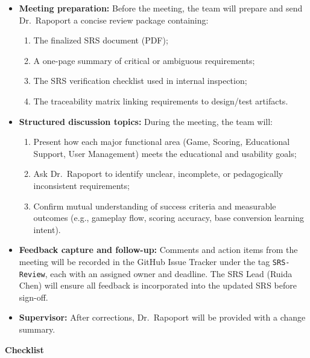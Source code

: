 \documentclass[12pt, titlepage]{article}
\begin{document}
\begin{itemize}
    \item \textbf{Meeting preparation:}  
    Before the meeting, the team will prepare and send Dr.\ Rapoport a concise review package containing:
    \begin{enumerate}
        \item The finalized SRS document (PDF);  
        \item A one-page summary of critical or ambiguous requirements;  
        \item The SRS verification checklist used in internal inspection;  
        \item The traceability matrix linking requirements to design/test artifacts.
    \end{enumerate}

    \item \textbf{Structured discussion topics:}  
    During the meeting, the team will:
    \begin{enumerate}
        \item Present how each major functional area (Game, Scoring, Educational Support, User Management) meets the educational and usability goals;
        \item Ask Dr.\ Rapoport to identify unclear, incomplete, or pedagogically inconsistent requirements;
        \item Confirm mutual understanding of success criteria and measurable outcomes (e.g., gameplay flow, scoring accuracy, base conversion learning intent).
    \end{enumerate}

    \item \textbf{Feedback capture and follow-up:}  
    Comments and action items from the meeting will be recorded in the GitHub Issue Tracker under the tag \texttt{SRS-Review}, each with an assigned owner and deadline.  
    The SRS Lead (Ruida Chen) will ensure all feedback is incorporated into the updated SRS before sign-off.

    \item \textbf{Supervisor:}  
    After corrections, Dr.\ Rapoport will be provided with a change summary.
\end{itemize}
\noindent \textbf{Checklist}
\end{document}
